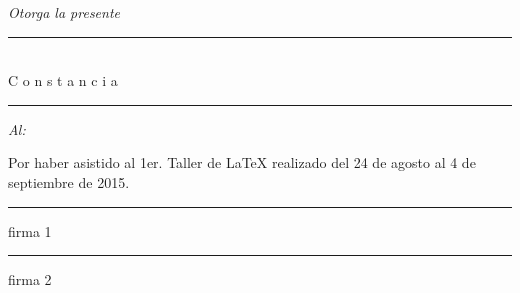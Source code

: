 \documentclass[12pt, landscape]{amsart}
\begin{document}
{\LARGE \it \sl Otorga la presente\\}
\begin{center}
\Huge \color{miazul}
\rule{0.65\textwidth}{3px}\\[5px]
{\sc \fontsize{45}{60}\selectfont  C o n s t a n c i a}\\[-20px]
\rule{0.65\textwidth}{3px}
\end{center}
{\Large \sl Al:}
\begin{center}
\color{miazul}
\Huge \sc \fontsize{30}{60}\selectfont{
C. Nombre del Interesado}
\end{center}
\vspace{3cm}
\begin{center}
\LARGE   Por haber asistido al 1er. Taller de {\rm \LaTeX} realizado del 24 de agosto al 4 de septiembre de 2015.
\end{center}
\vspace{2cm}
\hspace{1cm}
\centering
\begin{minipage}{.4\textwidth}
\centering
\hrule
firma 1
\end{minipage}
\hspace{1cm}
\begin{minipage}{.4\textwidth}
\centering
\hrule
firma 2
\end{minipage}















 
\end{document}
